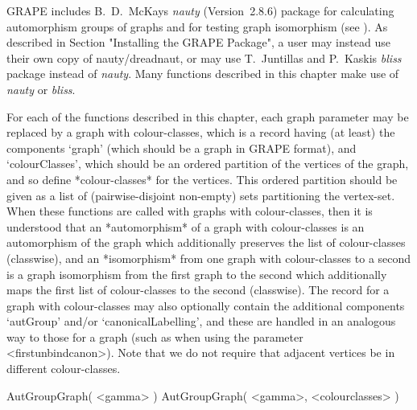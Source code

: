 %
%
%
%
\def\GRAPE{\sf GRAPE}
\def\nauty{\it nauty}
\def\bliss{\it bliss}
\def\G{\Gamma}
\def\Aut{{\rm Aut}\,}
\def\x{\times}

{\GRAPE} includes B.~D.~McKay{\pif}s {\nauty} (Version~2.8.6) package
for calculating automorphism groups of graphs and for testing graph
isomorphism (see \cite{MP14}).  As described in Section "Installing the
GRAPE Package", a user may instead use their own copy of nauty/dreadnaut,
or may use T.~Juntilla{\pif}s and P.~Kaski{\pif}s {\bliss} package
\cite{JK07} instead of {\nauty}. Many functions described in this chapter
make use of {\nauty} or {\bliss}.


For each of the functions described in this chapter, each graph parameter
may be replaced by a graph with colour-classes, which is a record having
(at least) the components `graph' (which should be a graph in {\GRAPE}
format), and `colourClasses', which should be an ordered partition of the
vertices of the graph, and so define *colour-classes* for the vertices.
This ordered partition should be given as a list of (pairwise-disjoint
non-empty) sets partitioning the vertex-set.  When these functions are
called with graphs with colour-classes, then it is understood that an
*automorphism* of a graph with colour-classes is an automorphism of the
graph which additionally preserves the list of colour-classes (classwise),
and an *isomorphism* from one graph with colour-classes to a second is a
graph isomorphism from the first graph to the second which additionally
maps the first list of colour-classes to the second (classwise). The
record for a graph with colour-classes may also optionally contain the
additional components `autGroup' and/or `canonicalLabelling', and these
are handled in an analogous way to those for a graph (such as when using
the parameter <firstunbindcanon>).  Note that we do not require that
adjacent vertices be in different colour-classes.


\>AutGroupGraph( <gamma> )
\>AutGroupGraph( <gamma>, <colourclasses> )

